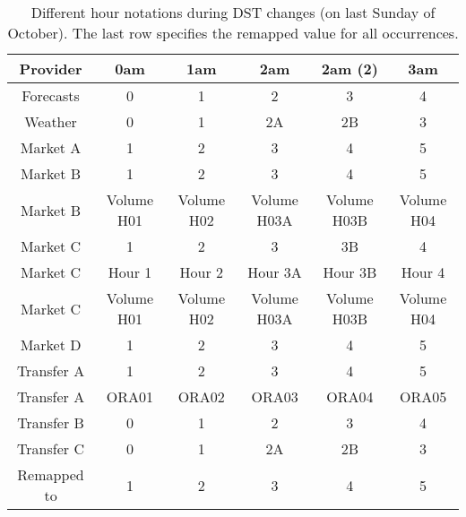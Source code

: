     \begin{table}
        \centering
        \begin{tabular}{|c|c c c c c|}
            \toprule
            Provider    & 0am        & 1am        & 2am         & 2am (2)     & 3am        \\
            \midrule
            Forecasts	& 0          & 1          & 2           & 3           & 4          \\
            Weather	    & 0          & 1          & 2A          & 2B          & 3          \\
            Market A	& 1          & 2          & 3           & 4           & 5          \\
            Market B	& 1          & 2          & 3           & 4           & 5          \\
            Market B	& Volume H01 & Volume H02 & Volume H03A & Volume H03B & Volume H04 \\
            Market C	& 1          & 2          & 3           & 3B          & 4          \\
            Market C	& Hour 1     & Hour 2     & Hour 3A     & Hour 3B     & Hour 4     \\
            Market C	& Volume H01 & Volume H02 & Volume H03A & Volume H03B & Volume H04 \\
            Market D	& 1          & 2          & 3           & 4           & 5          \\
            Transfer A  & 1          & 2          & 3           & 4           & 5          \\
            Transfer A  & ORA01      & ORA02      & ORA03       & ORA04       & ORA05      \\
            Transfer B  & 0          & 1          & 2           & 3           & 4          \\
            Transfer C  & 0          & 1          & 2A          & 2B          & 3          \\
            \midrule
            Remapped to & 1          & 2          & 3           & 4           & 5          \\
            \bottomrule
        \end{tabular}
        \caption{
            Different hour notations during DST changes (on last Sunday of October).
            The last row specifies the remapped value for all occurrences.
        }
        \label{tab:dwh:remapping:hour:notation:3}
    \end{table}

